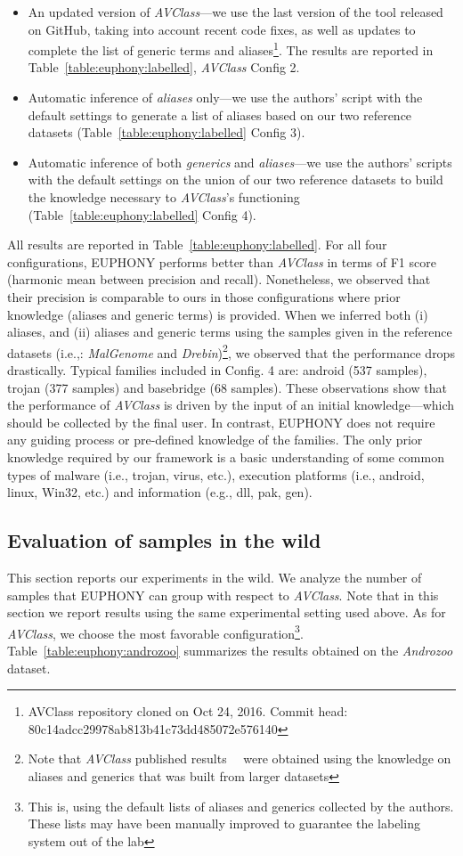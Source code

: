 \begin{itemize}
	\item An updated version of {\em AVClass}---we use the last version of the tool released on GitHub, taking into account recent code fixes, as well as updates to complete the list of generic terms and aliases\footnote{AVClass repository cloned on Oct 24, 2016. Commit head: 80c14adcc29978ab813b41c73dd485072e576140}. The results are reported in Table~\ref{table:euphony:labelled}, {\em AVClass} Config 2.
	\item Automatic inference of \textit{aliases} only---we use the authors' script with the default settings to generate a list of aliases based on our two reference datasets (Table~\ref{table:euphony:labelled} Config 3).
	\item Automatic inference of both \textit{generics} and \textit{aliases}---we use the authors' scripts with the default settings on the union of our two reference datasets to build the knowledge necessary to {\em AVClass}'s functioning (Table~\ref{table:euphony:labelled} Config 4).
\end{itemize}

All results are reported in Table~\ref{table:euphony:labelled}.
For all four configurations, EUPHONY performs better than {\em AVClass} in terms of F1 score (harmonic mean between precision and recall).
Nonetheless, we observed that their precision is comparable to ours in those configurations where prior knowledge (aliases and generic terms) is provided.
When we inferred both (i) aliases, and (ii) aliases and generic terms using the samples given in the reference datasets (i.e.,: {\em MalGenome} and {\em Drebin})\footnote{Note that {\em AVClass} published results~~\cite{monrose_avclass:_2016} were obtained using the knowledge on aliases and generics that was built from larger datasets}, we observed that the performance drops drastically.
Typical families included in Config.
4 are: android (537 samples), trojan (377 samples) and basebridge (68 samples).
These observations show that the performance of {\em AVClass} is driven by the input of an initial knowledge---which should be collected by the final user.
In contrast, EUPHONY does not require any guiding process or pre-defined knowledge of the families.
The only prior knowledge required by our framework is a basic understanding of some common types of malware (i.e., trojan, virus, etc.), execution platforms (i.e., android, linux, Win32, etc.) and information (e.g., dll, pak, gen).
\subsection{Evaluation of samples in the wild}
This section reports our experiments in the wild.
We analyze the number of samples that EUPHONY can group with respect to {\em AVClass}.
Note that in this section we report results using the same experimental setting used above.
As for {\em AVClass}, we choose the most favorable configuration\footnote{This is, using the default lists of aliases and generics collected by the authors.
	These lists may have been manually improved to guarantee the labeling system out of the lab}.
Table~\ref{table:euphony:androzoo} summarizes the results obtained on the {\em Androzoo} dataset.

